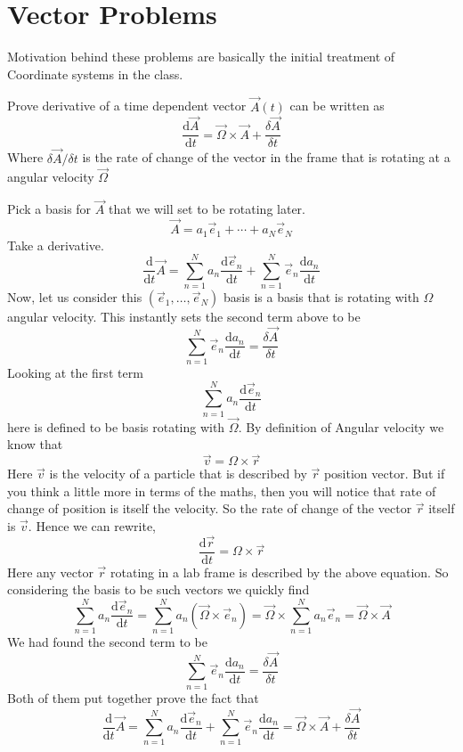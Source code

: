 \documentclass[10pt]{article}
\begin{document}
\part{Vector Problems} 
\textsf{Motivation behind these problems are basically the initial treatment of Coordinate systems in the class.}
\begin{prob}
	Prove derivative of a time dependent vector $\vec{A}(t)$ can be written as 
	\[
	\frac{\mathrm{d} \vec{A}}{\mathrm{d} t} = \vec{\Omega} \times \vec{A} + 
	\frac{\delta \vec{A}}{\delta t}
	\] 
	Where $\delta \vec{A} / \delta t$ is the rate of change of the vector in the frame that is rotating at a angular velocity $\vec{\Omega}$
\end{prob}
\begin{solu}
	Pick a basis for $\vec{A}$ that we will set to be rotating later. 
	\[
		\vec{A} = a_1 \vec{e}_1 + \cdots + a_N \vec{e}_N
	\]
	Take a derivative. 
	\[
	\frac{\mathrm{d} }{\mathrm{d} t} \vec{A} = 
	\sum_{n=1}^{N} a_n \frac{\mathrm{d} \vec{e}_n}{\mathrm{d} t} + 
	\sum_{n=1}^{N} \vec{e}_n \frac{\mathrm{d} a_n}{\mathrm{d} t}
	\]
	Now, let us consider this $(\vec{e}_1, \ldots, \vec{e}_N)$ basis is a basis that is rotating with $\Omega$ angular velocity. This instantly sets the second term above to be 
	\[
	\sum_{n=1}^{N} \vec{e}_n \frac{\mathrm{d} a_n}{\mathrm{d} t} = \frac{\delta \vec{A}}{\delta t}
	\]
	Looking at the first term 
	\[
	\sum_{n=1}^{N} a_n \frac{\mathrm{d} \vec{e}_n}{\mathrm{d} t}
	\] 
	here is defined to be basis rotating with $\vec{\Omega}$. By definition of Angular velocity we know that 
	\[
	\vec{v} = \Omega \times  \vec{r}
	\] 
	Here $\vec{v}$ is the velocity of a particle that is described by $\vec{r}$ position vector. But if you think a little more in terms of the maths, then you will notice that rate of change of position is itself the velocity. So the rate of change of the vector $\vec{r}$ itself is $\vec{v}$. Hence we can rewrite, 
	\[
	\frac{\mathrm{d} \vec{r}}{\mathrm{d} t} = \Omega \times \vec{r}
	\] 
	Here any vector $\vec{r}$ rotating in a lab frame is described by the above equation. So considering the basis to be such vectors we quickly find 
	\[
	\sum_{n=1}^{N} a_n \frac{\mathrm{d} \vec{e}_n}{\mathrm{d} t} =
	\sum_{n=1}^{N} a_n \left(\vec{\Omega} \times  \vec{e}_n\right) = 
	\vec{\Omega} \times  \sum_{n=1}^{N} a_n \vec{e}_n = \vec{\Omega} \times \vec{A}
	\]
	We had found the second term to be 
	\[
	\sum_{n=1}^{N} \vec{e}_n \frac{\mathrm{d} a_n}{\mathrm{d} t} = \frac{\delta \vec{A}}{\delta t}
	\]
	Both of them put together prove the fact that 
	\[
	\frac{\mathrm{d} }{\mathrm{d} t} \vec{A} = 
	\sum_{n=1}^{N} a_n \frac{\mathrm{d} \vec{e}_n}{\mathrm{d} t} + 
	\sum_{n=1}^{N} \vec{e}_n \frac{\mathrm{d} a_n}{\mathrm{d} t} = \boxed{
	\vec{\Omega} \times  \vec{A} + \frac{\delta \vec{A}}{\delta t}
}\] 
\end{solu}
\end{document}
